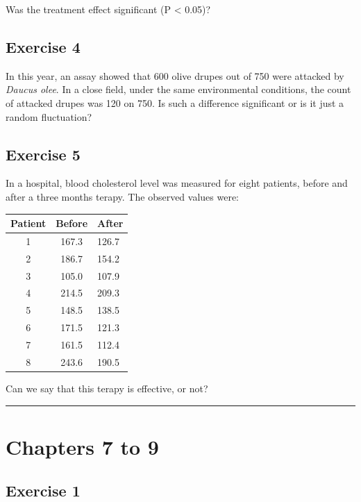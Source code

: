 \documentclass[a4paper,12pt,oneside]{book}
\begin{document}
Was the treatment effect significant (P \textless{} 0.05)?

\hypertarget{exercise-4-1}{%
\subsection{Exercise 4}\label{exercise-4-1}}

In this year, an assay showed that 600 olive drupes out of 750 were attacked by \emph{Daucus olee}. In a close field, under the same environmental conditions, the count of attacked drupes was 120 on 750. Is such a difference significant or is it just a random fluctuation?

\hypertarget{exercise-5-1}{%
\subsection{Exercise 5}\label{exercise-5-1}}

In a hospital, blood cholesterol level was measured for eight patients, before and after a three months terapy. The observed values were:

\begin{longtable}[]{@{}ccl@{}}
\toprule
Patient & Before & After \\
\midrule
\endhead
1 & 167.3 & 126.7 \\
2 & 186.7 & 154.2 \\
3 & 105.0 & 107.9 \\
4 & 214.5 & 209.3 \\
5 & 148.5 & 138.5 \\
6 & 171.5 & 121.3 \\
7 & 161.5 & 112.4 \\
8 & 243.6 & 190.5 \\
\bottomrule
\end{longtable}

Can we say that this terapy is effective, or not?

\begin{center}\rule{0.5\linewidth}{0.5pt}\end{center}

\hypertarget{chapters-7-to-9}{%
\section{Chapters 7 to 9}\label{chapters-7-to-9}}

\hypertarget{exercise-1-4}{%
\subsection{Exercise 1}\label{exercise-1-4}}
\end{document}
